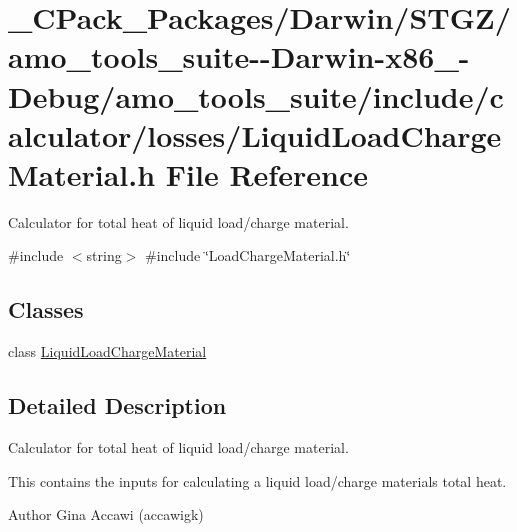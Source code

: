 \hypertarget{___c_pack___packages_2_darwin_2_s_t_g_z_2amo__tools__suite--_darwin-x86__64-_debug_2amo__tools__974ce681e19f30c318f61f836802c450}{}\section{\+\_\+\+C\+Pack\+\_\+\+Packages/\+Darwin/\+S\+T\+G\+Z/amo\+\_\+tools\+\_\+suite-\/-\/\+Darwin-\/x86\+\_-\/\+Debug/amo\+\_\+tools\+\_\+suite/include/calculator/losses/\+Liquid\+Load\+Charge\+Material.h File Reference}
\label{___c_pack___packages_2_darwin_2_s_t_g_z_2amo__tools__suite--_darwin-x86__64-_debug_2amo__tools__974ce681e19f30c318f61f836802c450}


Calculator for total heat of liquid load/charge material.  


{\ttfamily \#include $<$string$>$}\newline
{\ttfamily \#include \char`\"{}Load\+Charge\+Material.\+h\char`\"{}}\newline
\subsection*{Classes}
\begin{DoxyCompactItemize}
\item 
class \hyperlink{class_liquid_load_charge_material}{Liquid\+Load\+Charge\+Material}
\end{DoxyCompactItemize}


\subsection{Detailed Description}
Calculator for total heat of liquid load/charge material. 

This contains the inputs for calculating a liquid load/charge material\textquotesingle{}s total heat.

\begin{DoxyAuthor}{Author}
Gina Accawi (accawigk) 
\end{DoxyAuthor}
